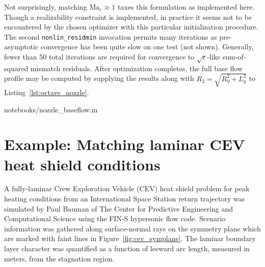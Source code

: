 \documentclass[letterpaper,11pt,nointlimits,reqno]{amsart}
\newcommand{\Mach}[1][]{\ensuremath{\mbox{Ma}_{#1}}}
\begin{document}
Not surprisingly, matching $\Mach[e]{}\approx{}1$ taxes this formulation as
implemented here.  Though a realizability constraint is implemented, in practice
it seems not to be encountered by the chosen optimizer with this particular
initialization procedure.  The second \texttt{nonlin\_residmin} invocation
permits many iterations as pre-asymptotic convergence has been quite slow on
one test (not shown).  Generally, fewer than 50 total iterations are required
for convergence to $\sqrt{\epsilon}$-like sum-of-squared mismatch residuals.
After optimization completes, the full base flow profile may be computed by
supplying the results along with $R_2 = \sqrt{R_0^2 + L_y^2}$ to
Listing~\ref{lst:octave_nozzle}.

\pagebreak[4]

                {notebooks/nozzle_baseflow.m}

\section{Example: Matching laminar CEV heat shield conditions}

A fully-laminar Crew Exploration Vehicle (CEV) heat shield problem for peak
heating conditions from an International Space Station return trajectory was
simulated by Paul Bauman of The Center for Predictive Engineering and
Computational Science using the FIN-S hypersonic flow
code\citep{KirkModeling2013}.  Scenario information was gathered along
surface-normal rays on the symmetry plane which are marked with faint lines in
Figure~\ref{fig:cev_symplane}.  The laminar boundary layer character was
quantified as a function of leeward arc length, measured in meters, from the
stagnation region.
\end{document}
